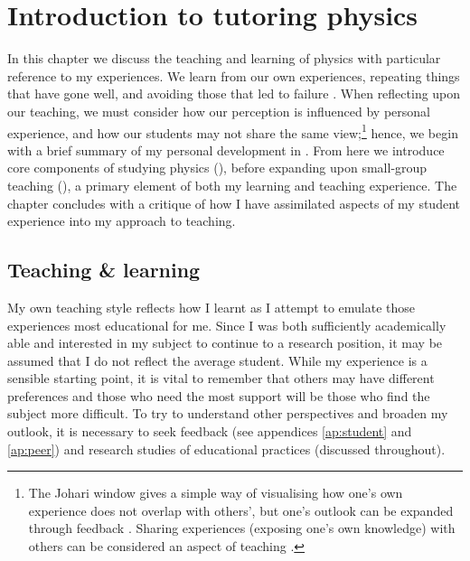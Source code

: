 \chapter{Introduction to tutoring physics}\label{ch:intro}

In this chapter we discuss the teaching and learning of physics with particular reference to my experiences. We learn from our own experiences, repeating things that have gone well, and avoiding those that led to failure \citep[chapter 2]{Skinner1954,Kolb1984}. When reflecting upon our teaching, we must consider how our perception is influenced by personal experience, and how our students may not share the same view;\footnote{The Johari window gives a simple way of visualising how one's own experience does not overlap with others', but one's outlook can be expanded through feedback \citep{Luft1961}. Sharing experiences (exposing one's own knowledge) with others can be considered an aspect of teaching \citep[cf.][chapter 7]{Ramsden1992}.} hence, we begin with a brief summary of my personal development in . From here we introduce core components of studying physics (), before expanding upon small-group teaching (), a primary element of both my learning and teaching experience. %
The chapter concludes with a critique of how I have assimilated aspects of my student experience into my approach to teaching.

\section{Teaching \& learning}\label{sec:teach-n-learn}

My own teaching style reflects how I learnt as I attempt to emulate those experiences most educational for me. Since I was both sufficiently academically able and interested in my subject to continue to a research position, it may be assumed that I do not reflect the average student. While my experience is a sensible starting point, it is vital to remember that others may have different preferences \citep[chapter 5]{Ramsden1992} and those who need the most support will be those who find the subject more difficult. To try to understand other perspectives and broaden my outlook, it is necessary to seek feedback (see appendices \ref{ap:student} and \ref{ap:peer}) and research studies of educational practices (discussed throughout).

